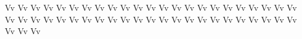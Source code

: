 \documentclass{worksheet}
\begin{document}
\begin{drillsheet}
\calligra
Vv Vv Vv Vv Vv Vv Vv Vv Vv Vv Vv Vv Vv Vv Vv Vv Vv Vv Vv Vv Vv Vv Vv Vv Vv Vv Vv Vv Vv Vv Vv Vv Vv Vv Vv Vv Vv Vv Vv Vv Vv Vv Vv Vv Vv Vv Vv Vv Vv
\end{drillsheet}
\end{document}
